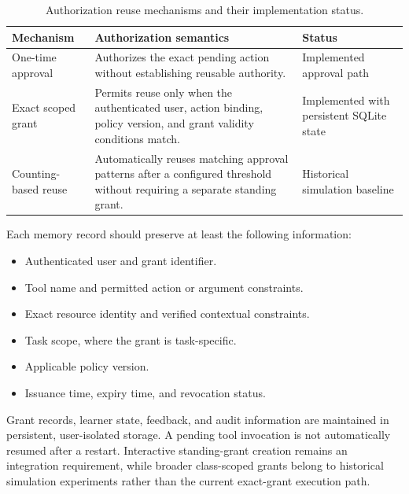 \documentclass[10pt,conference]{IEEEtran}
\begin{document}
\begin{table}[!t]
\centering
\caption{Authorization reuse mechanisms and
their implementation status.}
\label{tab:memory_mechanisms}
\footnotesize
\begin{tabular}{p{3.2cm}p{7.0cm}p{5.0cm}}
\toprule
Mechanism & Authorization semantics & Status \\
\midrule
One-time approval &
Authorizes the exact pending action without
establishing reusable authority. &
Implemented approval path \\
\addlinespace
Exact scoped grant &
Permits reuse only when the authenticated user,
action binding, policy version, and grant
validity conditions match. &
Implemented with persistent SQLite state \\
\addlinespace
Counting-based reuse &
Automatically reuses matching approval patterns
after a configured threshold without requiring
a separate standing grant. &
Historical simulation baseline \\
\bottomrule
\end{tabular}
\end{table}



Each memory record should preserve at least the following information:

\begin{itemize}
    \item Authenticated user and grant identifier.
    \item Tool name and permitted action or argument constraints.
    \item Exact resource identity and verified contextual constraints.
    \item Task scope, where the grant is task-specific.
    \item Applicable policy version.
    \item Issuance time, expiry time, and revocation status.
\end{itemize}


Grant records, learner state, feedback, and
audit information are maintained in persistent,
user-isolated storage. A pending tool invocation
is not automatically resumed after a restart.
Interactive standing-grant creation remains
an integration requirement, while broader
class-scoped grants belong to historical
simulation experiments rather than the
current exact-grant execution path.

\end{document}
